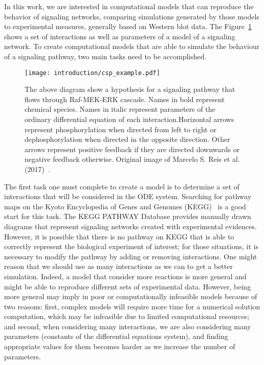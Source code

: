In this work, we are interested in computational models that can 
reproduce the behavior of signaling networks, comparing simulations
generated by those models to experimental measures, generally based on
Western blot data. The Figure~\ref{fig:signal_pathway_example} shows a
set of interactions as well as parameters of a model of a signaling 
network. To create computational models that are able to simulate the 
behaviour of a signaling pathway, two main tasks need to be 
accomplished.

\begin{figure}[!ht]
\centering 
    \texttt{[image: introduction/csp\_example.pdf]}
\caption{The above diagram show a hypothesis for a signaling pathway 
    that flows through Raf-MEK-ERK cascade. Names in bold represent 
    chemical species. Names in italic represent parameters of the 
    ordinary differential equation of each interaction.Horizontal arrows
    represent phosphorylation when directed from left to right or 
    dephosphorylation when directed in the opposite direction. Other 
    arrows represent positive feedback if they are directed downwards or 
    negative feedback otherwise. Original image of Marcelo S. Reis et
    al. (2017)~\cite{Reis2017}.}
\label{fig:signal_pathway_example}
\end{figure}

The first task one must complete to create a model is to determine a set 
of interactions that will be considered in the ODE system. Searching for 
pathway maps on the Kyoto Encyclopedia of Genes and Genomes 
(KEGG)~\cite{Kanehisa2000kegg} is a good start for this task. The KEGG 
PATHWAY Database provides manually drawn diagrams that represent 
signaling networks created with experimental evidences. However, it is 
possible that there is no pathway on KEGG that is able to correctly 
represent the biological experiment of interest; for those situations, 
it is necessary to modify the pathway by adding or removing 
interactions. One might reason that we should use as many interactions 
as we can to get a better simulation. Indeed, a model that consider more
reactions is more general and might be able to reproduce different sets
of experimental data. However, being more general may imply in poor or 
computationally infeasible models because of two reasons: first, 
complex models will require more time for a numerical solution 
computation, which may be infeasible due to limited computational 
resources; and second, when considering many interactions, we are also 
considering many parameters (constants of the differential equations 
system), and finding appropriate values for them becomes harder as we 
increase the number of parameters.

